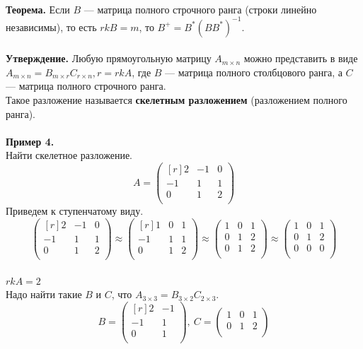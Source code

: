 \documentclass[12pt]{article}
\theoremstyle{definition}
\numberwithin{equation}{section}
\begin{document}
\\
\textbf{Теорема.}
Если $B$ --- матрица полного строчного ранга (строки линейно независимы), то есть $rkB=m$, то $B^+=B^*(BB^*)^{-1}$.\\ \\
\textbf{Утверждение.}
Любую прямоугольную матрицу $A_{m \times n}$ можно представить в виде 
$A_{m \times n}=B_{m \times r}C_{r \times n}, r=rkA$, где $B$ --- матрица полного столбцового ранга, а $C$ --- матрица полного строчного ранга.\\
Такое разложение называется \textbf{скелетным разложением} (разложением полного ранга).\\ \\
\textbf{Пример 4.}\\
Найти скелетное разложение.\\
\[A = \begin{pmatrix}[r]
2 & -1 & 0 \\         
-1 & 1 & 1 \\
0 & 1 & 2 \\
\end{pmatrix}\]
Приведем к ступенчатому виду.\\
\[\begin{pmatrix}[r]
2 & -1 & 0 \\         
-1 & 1 & 1 \\
0 & 1 & 2 \\
\end{pmatrix} \approx \begin{pmatrix}[r]
1 & 0 & 1 \\         
-1 & 1 & 1\\
0 & 1 & 2\\
\end{pmatrix} \approx \begin{pmatrix}
1 & 0 & 1 \\         
0 & 1 & 2 \\
0 & 1 & 2 \\
\end{pmatrix} \approx \begin{pmatrix}
1 & 0 & 1 \\         
0 & 1 & 2 \\
0 & 0 & 0 \\
\end{pmatrix}\]\\
$rkA=2$\\
Надо найти такие $B$ и $C$, что $A_{3 \times 3}=B_{3 \times 2}C_{2 \times 3}$.
\[B = \begin{pmatrix}[r]
2 & -1 \\         
-1 & 1 \\
0 & 1 \\
\end{pmatrix}, ~ C = \begin{pmatrix}
1 & 0 & 1 \\         
0 & 1 & 2 \\
\end{pmatrix}\]
\end{document}
